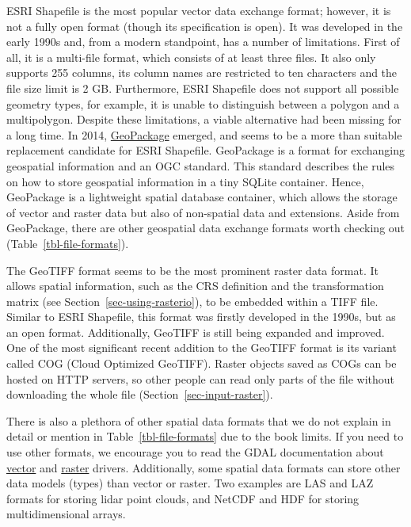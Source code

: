 \documentclass[
  letterpaper,
]{krantz}
\begin{document}
ESRI Shapefile is the most popular vector data exchange format; however,
it is not a fully open format (though its specification is open). It was
developed in the early 1990s and, from a modern standpoint, has a number
of limitations. First of all, it is a multi-file format, which consists
of at least three files. It also only supports 255 columns, its column
names are restricted to ten characters and the file size limit is 2 GB.
Furthermore, ESRI Shapefile does not support all possible geometry
types, for example, it is unable to distinguish between a polygon and a
multipolygon. Despite these limitations, a viable alternative had been
missing for a long time. In 2014,
\href{https://www.geopackage.org/}{GeoPackage} emerged, and seems to be
a more than suitable replacement candidate for ESRI Shapefile.
GeoPackage is a format for exchanging geospatial information and an OGC
standard. This standard describes the rules on how to store geospatial
information in a tiny SQLite container. Hence, GeoPackage is a
lightweight spatial database container, which allows the storage of
vector and raster data but also of non-spatial data and extensions.
Aside from GeoPackage, there are other geospatial data exchange formats
worth checking out (Table~\ref{tbl-file-formats}).

The GeoTIFF format seems to be the most prominent raster data format. It
allows spatial information, such as the CRS definition and the
transformation matrix (see Section~\ref{sec-using-rasterio}), to be
embedded within a TIFF file. Similar to ESRI Shapefile, this format was
firstly developed in the 1990s, but as an open format. Additionally,
GeoTIFF is still being expanded and improved. One of the most
significant recent addition to the GeoTIFF format is its variant called
COG (Cloud Optimized GeoTIFF). Raster objects saved as COGs can be
hosted on HTTP servers, so other people can read only parts of the file
without downloading the whole file (Section~\ref{sec-input-raster}).

There is also a plethora of other spatial data formats that we do not
explain in detail or mention in Table~\ref{tbl-file-formats} due to the
book limits. If you need to use other formats, we encourage you to read
the GDAL documentation about
\href{https://gdal.org/drivers/vector/index.html}{vector} and
\href{https://gdal.org/drivers/raster/index.html}{raster} drivers.
Additionally, some spatial data formats can store other data models
(types) than vector or raster. Two examples are LAS and LAZ formats for
storing lidar point clouds, and NetCDF and HDF for storing
multidimensional arrays.
\end{document}
